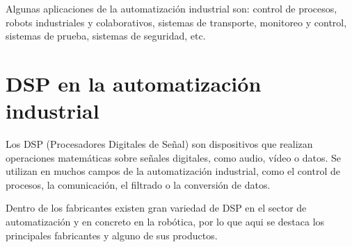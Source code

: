 \documentclass[11pt]{report}
\begin{document}
Algunas aplicaciones de la automatización industrial son: control de procesos, robots industriales y colaborativos,
sistemas de transporte, monitoreo y control, sistemas de prueba, sistemas de seguridad, etc.

\section{DSP en la automatización industrial}
Los DSP (Procesadores Digitales de Señal) son dispositivos que realizan operaciones matemáticas
sobre señales digitales, como audio, vídeo o datos. Se utilizan en muchos campos de la automatización
industrial, como el control de procesos, la comunicación, el filtrado o la conversión de datos.

Dentro de los fabricantes existen gran variedad de DSP en el sector de automatización y en concreto
en la robótica, por lo que aqui se destaca los principales fabricantes y alguno de sus productos.
\end{document}
